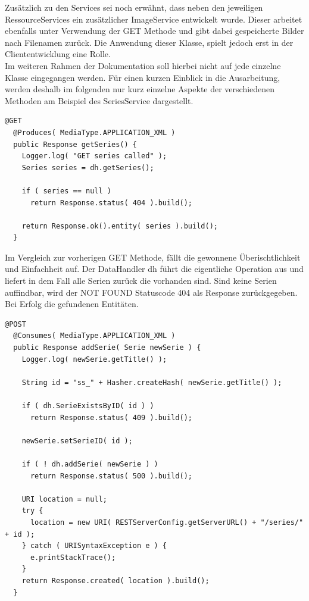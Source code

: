 Zusätzlich zu den Services sei noch erwähnt, dass neben den jeweiligen RessourceServices ein zusätzlicher ImageService entwickelt wurde. Dieser arbeitet ebenfalls unter Verwendung der GET Methode und gibt dabei gespeicherte Bilder nach Filenamen zurück. Die Anwendung dieser Klasse, spielt jedoch erst in der Cliententwicklung eine Rolle.\\
\newpage
Im weiteren Rahmen der Dokumentation soll hierbei nicht auf jede einzelne Klasse eingegangen werden. Für einen kurzen Einblick in die Ausarbeitung, werden deshalb im folgenden nur kurz einzelne Aspekte der verschiedenen Methoden am Beispiel des SeriesService dargestellt.
\begin{lstlisting}[label=getseriesservice,caption= GET Methode /series ]
  @GET
  @Produces( MediaType.APPLICATION_XML )
  public Response getSeries() {
    Logger.log( "GET series called" );
    Series series = dh.getSeries();

    if ( series == null )
      return Response.status( 404 ).build();

    return Response.ok().entity( series ).build();
  }
\end{lstlisting}
Im Vergleich zur vorherigen GET Methode, fällt die gewonnene Überischtlichkeit und Einfachheit auf. Der DataHandler dh führt die eigentliche Operation aus und liefert in dem Fall alle Serien zurück die vorhanden sind. Sind keine Serien auffindbar, wird der NOT FOUND Statuscode 404 als Response zurückgegeben. Bei Erfolg die gefundenen Entitäten.
\begin{lstlisting}[label=addseriesservice,caption= POST Methode /series ]
@POST
  @Consumes( MediaType.APPLICATION_XML )
  public Response addSerie( Serie newSerie ) {
    Logger.log( newSerie.getTitle() );

    String id = "ss_" + Hasher.createHash( newSerie.getTitle() );

    if ( dh.SerieExistsByID( id ) )
      return Response.status( 409 ).build();

    newSerie.setSerieID( id );

    if ( ! dh.addSerie( newSerie ) )
      return Response.status( 500 ).build();

    URI location = null;
    try {
      location = new URI( RESTServerConfig.getServerURL() + "/series/" + id );
    } catch ( URISyntaxException e ) {
      e.printStackTrace();
    }
    return Response.created( location ).build();
  }
\end{lstlisting}

